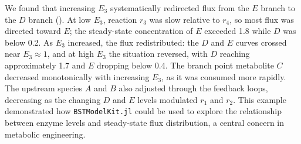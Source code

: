 \documentclass[11pt]{article}
\begin{document}
We found that increasing $E_3$ systematically redirected flux from the $E$ branch to the $D$ branch (). At low $E_3$, reaction $r_3$ was slow relative to $r_4$, so most flux was directed toward $E$; the steady-state concentration of $E$ exceeded 1.8 while $D$ was below 0.2. As $E_3$ increased, the flux redistributed: the $D$ and $E$ curves crossed near $E_3 \approx 1$, and at high $E_3$ the situation reversed, with $D$ reaching approximately 1.7 and $E$ dropping below 0.4. The branch point metabolite $C$ decreased monotonically with increasing $E_3$, as it was consumed more rapidly. The upstream species $A$ and $B$ also adjusted through the feedback loops, decreasing as the changing $D$ and $E$ levels modulated $r_1$ and $r_2$. This example demonstrated how \texttt{BSTModelKit.jl} could be used to explore the relationship between enzyme levels and steady-state flux distribution, a central concern in metabolic engineering.
\end{document}
